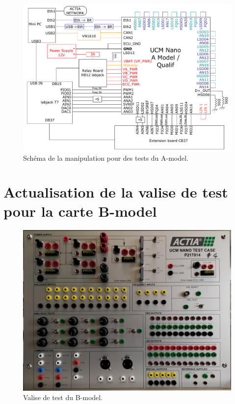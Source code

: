 \begin{figure}[H]
    \centering
    \includegraphics[width=1.00\textwidth]{images/schema-manip-helene}
    \caption{Schéma de la manipulation pour des tests du A-model.}
    \label{fig:schema-manip-helene}
\end{figure}




\section{Actualisation de la valise de test pour la carte B-model}



\begin{figure}[H]
    \centering
    \includegraphics[width=1.00\textwidth]{images/valise-B_model}
    \caption{Valise de test du B-model.}
    \label{fig:valise-B_model}
\end{figure}

